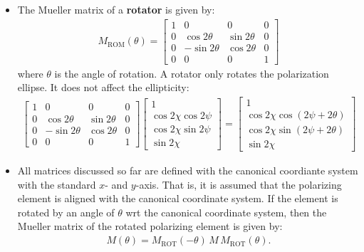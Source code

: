 \documentclass[10pt]{article}
\begin{document}
\begin{itemize}
		\item The Mueller matrix of a \textbf{rotator} is given by:
		\begin{align*}
			M_{\mathrm{ROM}}(\theta) = \begin{bmatrix}
				1 & 0 & 0 & 0 \\
				0 & \cos 2\theta & \sin 2\theta & 0 \\
				0 & -\sin 2\theta & \cos 2\theta & 0 \\
				0 & 0 & 0 & 1
			\end{bmatrix}
		\end{align*}
		where $\theta$ is the angle of rotation.  A rotator only rotates the polarization ellipse.  It does not affect the ellipticity:
		\begin{align*}
			\begin{bmatrix}
				1 & 0 & 0 & 0 \\
				0 & \cos 2\theta & \sin 2\theta & 0 \\
				0 & -\sin 2\theta & \cos 2\theta & 0 \\
				0 & 0 & 0 & 1
			\end{bmatrix}
			\begin{bmatrix}
				1 \\
				\cos 2\chi \cos 2\psi \\
				\cos 2\chi \sin 2\psi \\
				\sin 2\chi
			\end{bmatrix}
			= \begin{bmatrix}
				1 \\
				\cos 2\chi \cos (2\psi + 2\theta) \\
				\cos 2\chi \sin (2\psi + 2\theta) \\
				\sin 2\chi
			\end{bmatrix}
		\end{align*}

		\item All matrices discussed so far are defined with the canonical coordiante system with the standard $x$- and $y$-axis.  That is, it is assumed that the polarizing element is aligned with the canonical coordinate system.  If the element is rotated by an angle of $\theta$ wrt the canonical coordinate system, then the Mueller matrix of the rotated polarizing element is given by:
		\begin{align*}
			M(\theta) = M_{\mathrm{ROT}}(-\theta)\, M \, M_{\mathrm{ROT}}(\theta).
		\end{align*}


\end{itemize}
\end{document}
